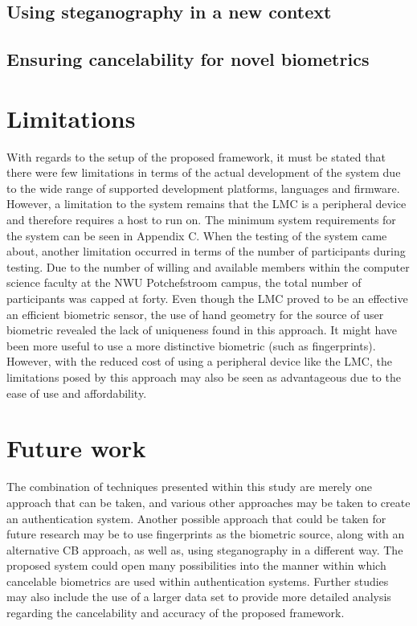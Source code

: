 \subsection{Using steganography in a new context}

\subsection{Ensuring cancelability for novel biometrics}

\section{Limitations}

With regards to the setup of the proposed framework, it must be stated that there were few limitations in terms of the actual development of the system due to the wide range of supported development platforms, languages and firmware. However, a limitation to the system remains that the LMC is a peripheral device and therefore requires a host to run on. The minimum system requirements for the system can be seen in Appendix C.
When the testing of the system came about, another limitation occurred in terms of the number of participants during testing. Due to the number of willing and available members within the computer science faculty at the NWU Potchefstroom campus, the total number of participants was capped at forty. 
Even though the LMC proved to be an effective an efficient biometric sensor, the use of hand geometry for the source of user biometric revealed the lack of uniqueness found in this approach. It might have been more useful to use a more distinctive biometric (such as fingerprints). However, with the reduced cost of using a peripheral device like the LMC, the limitations posed by this approach may also be seen as advantageous due to the ease of use and affordability.

\section{Future work}

The combination of techniques presented within this study are merely one approach that can be taken, and various other approaches may be taken to create an authentication system. Another possible approach that could be taken for future research may be to use fingerprints as the biometric source, along with an alternative CB approach, as well as, using steganography in a different way. The proposed system could open many possibilities into the manner within which cancelable biometrics are used within authentication systems.
Further studies may also include the use of a larger data set to provide more detailed analysis regarding the cancelability and accuracy of the proposed framework.

